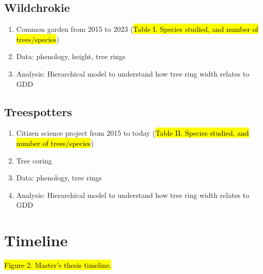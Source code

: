 \documentclass{article}
\begin{document}
\subsection*{Wildchrokie}
\begin {enumerate}
	\item Common garden from 2015 to 2023 (\hl{Table I. Species studied, and number of trees/species})
	\item Data: phenology, height, tree rings
	\item Analysis: Hierarchical model to understand how tree ring width relates to GDD
\end {enumerate}

\subsection*{Treespotters}
\begin {enumerate}
	\item Citizen science project from 2015 to today (\hl{Table II. Species studied, and number of trees/species})
	\item Tree coring
	\item Data: phenology, tree rings
	\item Analysis: Hierarchical model to understand how tree ring width relates to GDD	
\end {enumerate}

\section*{Timeline}
\hl{Figure 2. Master's thesis timeline.}

\end{document}
